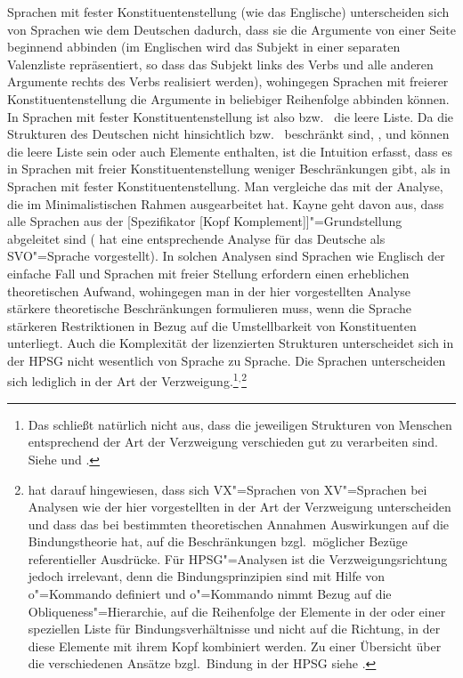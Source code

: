Sprachen mit fester
Konstituentenstellung (wie das
Englische) unterscheiden sich von Sprachen wie dem Deutschen dadurch, dass sie die
Argumente von einer Seite beginnend abbinden (im Englischen wird das Subjekt in einer separaten
Valenzliste repräsentiert, so dass das Subjekt links des Verbs und alle anderen Argumente rechts des
Verbs realisiert werden), wohingegen Sprachen mit freierer Konstituentenstellung die Argumente
in beliebiger Reihenfolge abbinden können. In Sprachen mit fester Konstituentenstellung ist also
 bzw.\  die leere Liste. Da die Strukturen des Deutschen nicht hinsichtlich 
bzw.\  beschränkt sind, \dash,  und  können die leere Liste sein oder auch
Elemente enthalten, ist die Intuition erfasst, dass es in Sprachen mit freier Konstituentenstellung
weniger Beschränkungen gibt, als in Sprachen mit fester Konstituentenstellung. Man vergleiche das
mit der Analyse, die \citet{Kayne94a-u} im Minimalistischen Rahmen ausgearbeitet hat. Kayne geht
davon aus, dass alle Sprachen aus der [Spezifikator [Kopf Komplement]]"=Grundstellung abgeleitet sind
(\citet{Laenzlinger2004a} hat eine entsprechende Analyse für das Deutsche als
SVO"=Sprache vorgestellt). In solchen Analysen sind Sprachen wie
Englisch der einfache Fall und Sprachen mit freier Stellung erfordern einen erheblichen
theoretischen Aufwand, wohingegen man in der hier vorgestellten Analyse stärkere theoretische
Beschränkungen formulieren muss, wenn die Sprache stärkeren Restriktionen in Bezug auf die
Umstellbarkeit von Konstituenten unterliegt. Auch die Komplexität der lizenzierten Strukturen
unterscheidet sich in der HPSG nicht wesentlich von Sprache zu Sprache. Die Sprachen unterscheiden
sich lediglich in der Art der Verzweigung.\footnote{ 
Das schließt natürlich nicht aus, dass die
  jeweiligen Strukturen von Menschen entsprechend der Art der Verzweigung verschieden gut zu
  verarbeiten sind. Siehe  und \citet[Abschnitt~11.3]{MuellerGTBuch1}.
}$^,$\footnote{%
\citet[]{Haider97c} hat darauf hingewiesen, dass sich VX"=Sprachen von XV"=Sprachen bei
Analysen wie der hier vorgestellten in der Art der Verzweigung unterscheiden und dass das bei bestimmten
theoretischen Annahmen Auswirkungen auf die Bindungstheorie hat, \dash auf die
Beschränkungen bzgl.\ möglicher Bezüge referentieller Ausdrücke. Für HPSG"=Analysen
ist die Verzweigungsrichtung jedoch irrelevant, denn die Bindungsprinzipien sind mit Hilfe von
o"=Kommando definiert \citep[Kapitel~6]{ps2} und o"=Kommando nimmt Bezug auf die
Obliqueness"=Hierarchie, \dash auf die Reihenfolge der Elemente in der \argstl oder
einer speziellen Liste für Bindungsverhältnisse und nicht auf die Richtung, in der diese Elemente
mit ihrem Kopf kombiniert werden. Zu einer Übersicht über die verschiedenen Ansätze bzgl.\ Bindung
in der HPSG siehe . 
}


